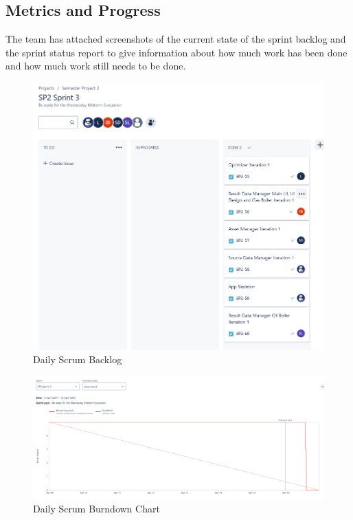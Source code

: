 \documentclass[12pt]{report}
\begin{document}
\subsection*{Metrics and Progress}
The team has attached screenshots of the current state of the sprint backlog and the sprint status report to give information about how much work has been done and how much work still needs to be done.

\begin{figure}[H]
  \centering
  \includegraphics[width=1\textwidth]{Resources/3-Sprint/Daily-Scrum/backlog_sprint3.png}
  \caption{Daily Scrum Backlog}
  \label{fig:S3Scrum1-image}
\end{figure}

\begin{figure}[H]
  \centering
  \includegraphics[width=1\textwidth]{Resources/3-Sprint/Daily-Scrum/burndownchart_sprint3.png}
  \caption{Daily Scrum Burndown Chart}
  \label{fig:S3Scrum2-image}
\end{figure}
\end{document}

